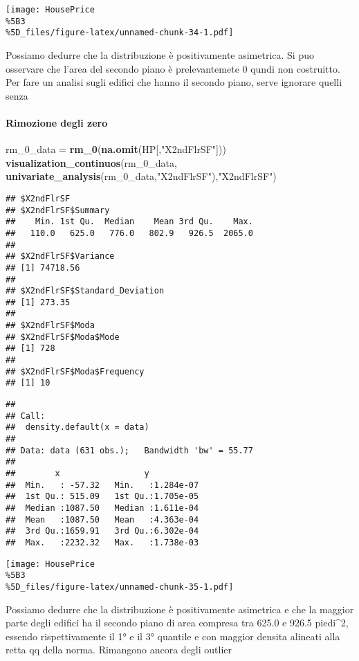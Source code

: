 \documentclass[
]{article}
\newenvironment{Shaded}{\begin{snugshade}}{\end{snugshade}}
\newcommand{\FunctionTok}[1]{\textcolor[rgb]{0.13,0.29,0.53}{\textbf{#1}}}
\newcommand{\NormalTok}[1]{#1}
\newcommand{\OtherTok}[1]{\textcolor[rgb]{0.56,0.35,0.01}{#1}}
\newcommand{\StringTok}[1]{\textcolor[rgb]{0.31,0.60,0.02}{#1}}
\begin{document}
\texttt{[image: HousePrice\\\%5B3\\\%5D\_files/figure-latex/unnamed-chunk-34-1.pdf]}

Possiamo dedurre che la distribuzione è positivamente asimetrica. Si puo
osservare che l'area del secondo piano è prelevantemete 0 qundi non
costruitto. Per fare un analisi sugli edifici che hanno il secondo
piano, serve ignorare quelli senza

\paragraph{Rimozione degli zero}\label{rimozione-degli-zero-6}

\begin{Shaded}
\begin{Highlighting}[]
\NormalTok{rm\_0\_data }\OtherTok{=} \FunctionTok{rm\_0}\NormalTok{(}\FunctionTok{na.omit}\NormalTok{(HP[,}\StringTok{"X2ndFlrSF"}\NormalTok{]))}
\FunctionTok{visualization\_continuos}\NormalTok{(rm\_0\_data, }\FunctionTok{univariate\_analysis}\NormalTok{(rm\_0\_data,}\StringTok{"X2ndFlrSF"}\NormalTok{),}\StringTok{"X2ndFlrSF"}\NormalTok{)}
\end{Highlighting}
\end{Shaded}

\begin{verbatim}
## $X2ndFlrSF
## $X2ndFlrSF$Summary
##    Min. 1st Qu.  Median    Mean 3rd Qu.    Max. 
##   110.0   625.0   776.0   802.9   926.5  2065.0 
## 
## $X2ndFlrSF$Variance
## [1] 74718.56
## 
## $X2ndFlrSF$Standard_Deviation
## [1] 273.35
## 
## $X2ndFlrSF$Moda
## $X2ndFlrSF$Moda$Mode
## [1] 728
## 
## $X2ndFlrSF$Moda$Frequency
## [1] 10
\end{verbatim}

\begin{verbatim}
## 
## Call:
##  density.default(x = data)
## 
## Data: data (631 obs.);   Bandwidth 'bw' = 55.77
## 
##        x                 y            
##  Min.   : -57.32   Min.   :1.284e-07  
##  1st Qu.: 515.09   1st Qu.:1.705e-05  
##  Median :1087.50   Median :1.611e-04  
##  Mean   :1087.50   Mean   :4.363e-04  
##  3rd Qu.:1659.91   3rd Qu.:6.302e-04  
##  Max.   :2232.32   Max.   :1.738e-03
\end{verbatim}

\texttt{[image: HousePrice\\\%5B3\\\%5D\_files/figure-latex/unnamed-chunk-35-1.pdf]}

Possiamo dedurre che la distribuzione è positivamente asimetrica e che
la maggior parte degli edifici ha il secondo piano di area compresa tra
625.0 e 926.5 piedi\^{}2, essendo rispettivamente il 1° e il 3° quantile
e con maggior densita alineati alla retta qq della norma. Rimangono
ancora degli outlier
\end{document}
